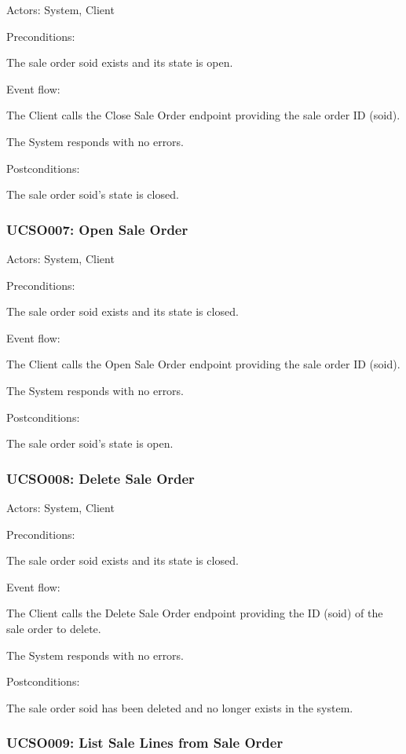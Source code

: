 Actors: System, Client

Preconditions:

\ucitem The sale order soid exists and its state is open.

Event flow:

\ucitem The Client calls the Close Sale Order endpoint providing the sale order ID (soid).

\ucitem The System responds with no errors.

Postconditions:

\ucitem The sale order soid’s state is closed.

\subsubsection{UCSO007: Open Sale Order}
\label{UCSO007}

Actors: System, Client

Preconditions:

\ucitem The sale order soid exists and its state is closed.

Event flow:

\ucitem The Client calls the Open Sale Order endpoint providing the sale order ID (soid).

\ucitem The System responds with no errors.

Postconditions:

\ucitem The sale order soid’s state is open.

\subsubsection{UCSO008: Delete Sale Order}
\label{UCSO008}

Actors: System, Client

Preconditions:

\ucitem The sale order soid exists and its state is closed.

Event flow:

\ucitem The Client calls the Delete Sale Order endpoint providing the ID (soid) of the sale order to delete.

\ucitem The System responds with no errors.

Postconditions:

\ucitem The sale order soid has been deleted and no longer exists in the system.

\subsubsection{UCSO009: List Sale Lines from Sale Order}
\label{UCSO009}

